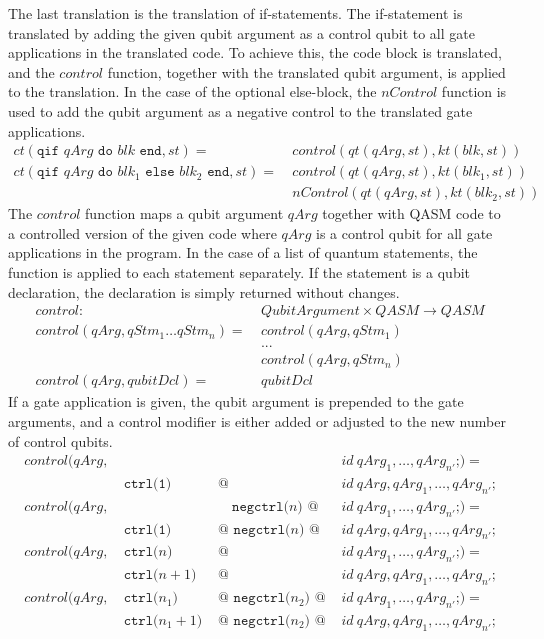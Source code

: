 The last translation is the translation of if-statements. The if-statement is translated by adding the given qubit argument as a control qubit to all gate applications in the translated code. To achieve this, the code block is translated, and the $control$ function, together with the translated qubit argument, is applied to the translation. In the case of the optional else-block, the $nControl$ function is used to add the qubit argument as a negative control to the translated gate applications.
\begin{align*}
        ct(\texttt{qif } qArg \texttt{ do } blk \texttt{ end}, st) = \ 
            &  control(qt(qArg, st), kt(blk, st)) \\
        ct(\texttt{qif } qArg \texttt{ do } blk_1 \texttt{ else } blk_2 \texttt{ end}, st) = \ 
            &  control(qt(qArg, st), kt(blk_1, st)) \\
            &  nControl(qt(qArg, st), kt(blk_2, st))
\end{align*}
The $control$ function maps a qubit argument $qArg$ together with QASM code to a controlled version of the given code where $qArg$ is a control qubit for all gate applications in the program. In the case of a list of quantum statements, the function is applied to each statement separately. If the statement is a qubit declaration, the declaration is simply returned without changes.
\begin{align*}
    control : \ & QubitArgument \times QASM \to QASM\\
    control(qArg, qStm_1 \dots qStm_n) = \ & control(qArg, qStm_1)\\
        & ...\\
        & control(qArg, qStm_n)\\
    control(qArg, qubitDcl) = \ & qubitDcl
\end{align*}
If a gate application is given, the qubit argument is prepended to the gate arguments, and a control modifier is either added or adjusted to the new number of control qubits.
\begin{align*}
    control(qArg, & &&  id \ qArg_1, \dots, qArg_{n'} \texttt{;}) = \\  
    & \ \texttt{ctrl(1) } &\texttt{@ }& id \ qArg, qArg_1, \dots, qArg_{n'}\texttt{;}\\
    control(qArg, & & \quad \texttt{negctrl(}n\texttt{) } \texttt{@ }& id \ qArg_1, \dots, qArg_{n'} \texttt{;}) = \\
    & \ \texttt{ctrl(1) } &\texttt{@ } \texttt{negctrl(}n\texttt{) } \texttt{@ }&id \ qArg, qArg_1, \dots, qArg_{n'}\texttt{;}\\
    control(qArg, & \ \texttt{ctrl(}n \texttt{) } &\texttt{@ }& id \ qArg_1, \dots, qArg_{n'} \texttt{;}) = \\
    & \ \texttt{ctrl(}n+1 \texttt{) } &\texttt{@ }& id \ qArg, qArg_1, \dots, qArg_{n'}\texttt{;}\\
    control(qArg, & \ \texttt{ctrl(}n_1 \texttt{) } & \texttt{@ } \texttt{negctrl(}n_2\texttt{) } \texttt{@ }& id \ qArg_1, \dots, qArg_{n'} \texttt{;}) = \\
    & \ \texttt{ctrl(}n_1+1 \texttt{) } &\texttt{@ } \texttt{negctrl(}n_2\texttt{) } \texttt{@ }& id \ qArg, qArg_1, \dots, qArg_{n'}\texttt{;}
\end{align*}
